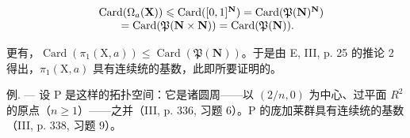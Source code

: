 \[
\begin{array}{r l} & {\mathrm{Card} (\Omega_ {a} (\mathbf {X})) \leqslant \mathrm{Card} ([ 0, 1 ] ^ {\mathbf {N}}) = \mathrm{Card} (\mathfrak {P} (\mathbf {N}) ^ {\mathbf {N}})} \\ & {\qquad = \mathrm{Card} (\mathfrak {P} (\mathbf {N} \times \mathbf {N})) = \mathrm{Card} (\mathfrak {P} (\mathbf {N})).} \end{array}
\]

更有，\(\operatorname{Card}(\pi_{1}(\mathrm{X},a))\leqslant\operatorname{Card}(\mathfrak{P}(\mathbf{N}))\)。于是由 E, III, p. 25 的推论 2 得出，\(\pi_{1}(\mathrm{X},a)\) 具有连续统的基数，此即所要证明的。

例. --- 设 P 是这样的拓扑空间：它是诸圆周——以 \((2/n,0)\) 为中心、过平面 \(R^{2}\) 的原点（\(n \geqslant 1\)）——之并（III, p. 336, 习题 6）。P 的庞加莱群具有连续统的基数（III, p. 338, 习题 9）。

